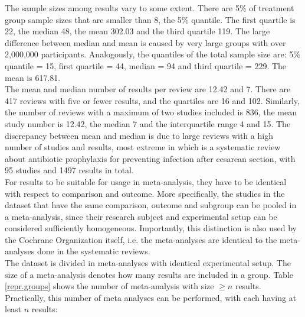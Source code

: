 \documentclass[11pt,a4paper,twoside]{book}\usepackage[]{graphicx}\usepackage[]{color}
\begin{document}
The sample sizes among results vary to some extent. There are 5\% of treatment group sample sizes that are smaller than 8, the 5\% quantile. The first quartile is 22, the median 48, the mean 302.03 and the third quartile 119. The large difference between median and mean is caused by very large groups with over 2,000,000 participants. Analogously, the quantiles of the total sample size are: 5\% quantile = 15, first quartile = 44, median = 94 and third quartile = 229. The mean is 617.81. \\
The mean and median number of results per review are 12.42 and 7. There are 417 reviews with five or fewer results, and the quartiles are 16 and 102. Similarly, the number of reviews with a maximum of two studies included is 836, the mean study number is 12.42, the median 7 and the interquartile range 4 and 15. The discrepancy between mean and median is due to large reviews with a high number of studies and results, most extreme in \citet{largest.review} which is a systematic review about antibiotic prophylaxis for preventing infection after cesarean section, with 95 studies and 1497 results in total. \\
For results to be suitable for usage in meta-analysis, they have to be identical with respect to comparison and outcome. More specifically, the studies in the dataset that have the same comparison, outcome and subgroup can be pooled in a meta-analysis, since their research subject and experimental setup can be considered sufficiently homogeneous. Importantly, this distinction is also used by the Cochrane Organization itself, i.e. the meta-analyses are identical to the meta-analyses done in the systematic reviews.\\%
The dataset is divided in meta-analyses with identical experimental setup. The size of a meta-analysis denotes how many results are included in a group.
Table \ref{repr.groups} shows the number of meta-analysis with size $\geq n$ results. Practically, this number of meta analyses can be performed, with each having at least $n$ results:
\end{document}
